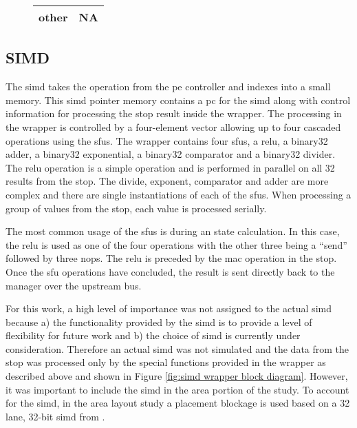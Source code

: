\begin{figure}[h]
\begin{minipage}{1\textwidth}
\begin{minipage}{1\textwidth}
\begin{minipage}[t]{1\textwidth}
\begin{minipage}[t]{0.25\textwidth}
\begin{adjustbox}{width=1\textwidth}
\begin{tabular}{ |c|c|  }
                other  & NA       \\
                \hline
              \end{tabular}
          \end{adjustbox}
        \end{minipage}
      \end{minipage}
    \end{minipage}
    \label{tab:stOp op fields}
  \end{minipage}
\end{figure}


\subsection{SIMD}
\label{sec:simd}

The \ac{simd} takes the operation from the \ac{pe} controller and indexes into a small memory. This \ac{simd} pointer memory contains a \ac{pc} for the \ac{simd} along with control information for processing the \ac{stop} result inside the wrapper.
The processing in the wrapper is controlled by a four-element vector allowing up to four cascaded operations using the \acp{sfu}.
The wrapper contains four \acp{sfu}, a \ac{relu}, a \ac{binary32} adder, a \ac{binary32} exponential, a \ac{binary32} comparator and a \ac{binary32} divider.
The \ac{relu} operation is a simple operation and is performed in parallel on all 32 results from the \ac{stop}.
The divide, exponent, comparator and adder are more complex and there are single instantiations of each of the \acp{sfu}.
When processing a group of values from the \ac{stop}, each value is processed serially.

The most common usage of the \acp{sfu} is during \ac{an} state calculation. In this case, the \ac{relu} is used as one of the four operations with the other three being a ``send'' followed by three \acp{nop}.
The \ac{relu} is preceded by the \ac{mac} operation in the \ac{stop}.
Once the \ac{sfu} operations have concluded, the result is sent directly back to the manager over the upstream bus.

For this work, a high level of importance was not assigned to the actual \ac{simd} because a) the functionality provided by the \ac{simd} is to provide a level of flexibility for future work and b) the choice of \ac{simd} is currently under consideration.
Therefore an actual \ac{simd} was not simulated and the data from the \ac{stop} was processed only by the special functions provided in the wrapper as described above and shown in Figure \ref{fig:simd wrapper block diagram}.
However, it was important to include the \ac{simd} in the area portion of the study.
To account for the \ac{simd}, in the area layout study a placement blockage is used based on a 32 lane, 32-bit \ac{simd} from \cite{schabel2014diss}.

